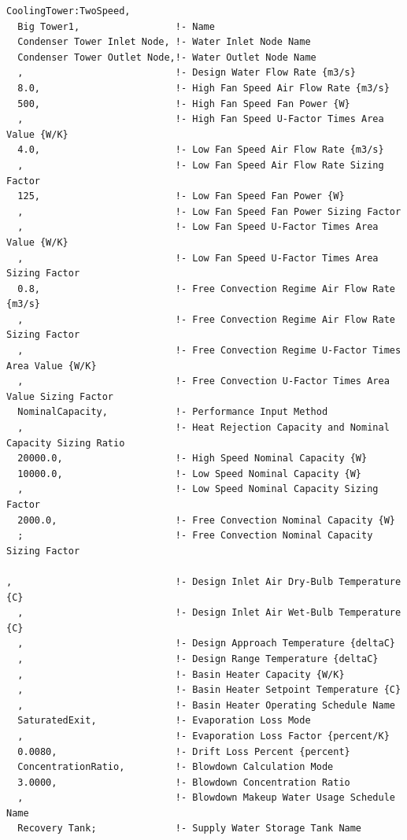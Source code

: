 \begin{lstlisting}
CoolingTower:TwoSpeed,
  Big Tower1,                 !- Name
  Condenser Tower Inlet Node, !- Water Inlet Node Name
  Condenser Tower Outlet Node,!- Water Outlet Node Name
  ,                           !- Design Water Flow Rate {m3/s}
  8.0,                        !- High Fan Speed Air Flow Rate {m3/s}
  500,                        !- High Fan Speed Fan Power {W}
  ,                           !- High Fan Speed U-Factor Times Area Value {W/K}
  4.0,                        !- Low Fan Speed Air Flow Rate {m3/s}
  ,                           !- Low Fan Speed Air Flow Rate Sizing Factor
  125,                        !- Low Fan Speed Fan Power {W}
  ,                           !- Low Fan Speed Fan Power Sizing Factor
  ,                           !- Low Fan Speed U-Factor Times Area Value {W/K}
  ,                           !- Low Fan Speed U-Factor Times Area Sizing Factor
  0.8,                        !- Free Convection Regime Air Flow Rate {m3/s}
  ,                           !- Free Convection Regime Air Flow Rate Sizing Factor
  ,                           !- Free Convection Regime U-Factor Times Area Value {W/K}
  ,                           !- Free Convection U-Factor Times Area Value Sizing Factor
  NominalCapacity,            !- Performance Input Method
  ,                           !- Heat Rejection Capacity and Nominal Capacity Sizing Ratio
  20000.0,                    !- High Speed Nominal Capacity {W}
  10000.0,                    !- Low Speed Nominal Capacity {W}
  ,                           !- Low Speed Nominal Capacity Sizing Factor
  2000.0,                     !- Free Convection Nominal Capacity {W}
  ;                           !- Free Convection Nominal Capacity Sizing Factor

,                             !- Design Inlet Air Dry-Bulb Temperature {C}
  ,                           !- Design Inlet Air Wet-Bulb Temperature {C}
  ,                           !- Design Approach Temperature {deltaC}
  ,                           !- Design Range Temperature {deltaC}
  ,                           !- Basin Heater Capacity {W/K}
  ,                           !- Basin Heater Setpoint Temperature {C}
  ,                           !- Basin Heater Operating Schedule Name
  SaturatedExit,              !- Evaporation Loss Mode
  ,                           !- Evaporation Loss Factor {percent/K}
  0.0080,                     !- Drift Loss Percent {percent}
  ConcentrationRatio,         !- Blowdown Calculation Mode
  3.0000,                     !- Blowdown Concentration Ratio
  ,                           !- Blowdown Makeup Water Usage Schedule Name
  Recovery Tank;              !- Supply Water Storage Tank Name


\end{lstlisting}
